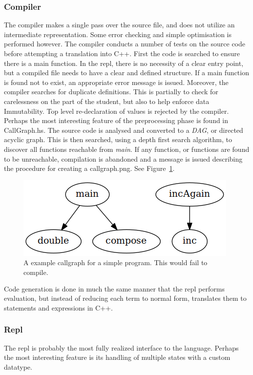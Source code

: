 \documentclass[12pt, a4paper]{report}
\begin{document}
\subsubsection{Compiler}
The compiler makes a single pass over the source file, and does not utilize an intermediate
representation. Some error checking and simple optimisation is performed however. The compiler
conducts a number of tests on the source code before attempting a translation into C++. First the
code is searched to ensure there is a main function. In the repl, there is no necessity of a clear
entry point, but a compiled file needs to have a clear and defined structure. If a main function is
found not to exist, an appropriate error message is issued. Moreover, the compiler searches for
duplicate definitions. This is partially to check for carelessness on the part of the student, but
also to help enforce data Immutability. Top level re-declaration of values is rejected by the
compiler. Perhaps the most interesting feature of the preprocessing phase is found in CallGraph.hs.
The source code is analysed and converted to a \textit{DAG}, or directed acyclic graph. This is then
searched, using a depth first search algorithm, to discover all functions reachable from
\textit{main}. If any function, or functions are found to be unreachable, compilation is abandoned
and a message is issued describing the procedure for creating a callgraph.png. See
Figure~\ref{fig:callgraph}.

\begin{figure}
    \includegraphics[scale=0.4]{images/callgraph.png}
    {\caption{A example callgraph for a simple program. This would fail to compile.}}
    \label{fig:callgraph}
\end{figure}

Code generation is done in much the same manner that the repl performs evaluation, but instead of
reducing each term to normal form, translates them to statements and expressions in C++. 

\subsubsection{Repl}
The repl is probably the most fully realized interface to the language. Perhaps the most interesting
feature is its handling of multiple states with a custom datatype. 
\end{document}
